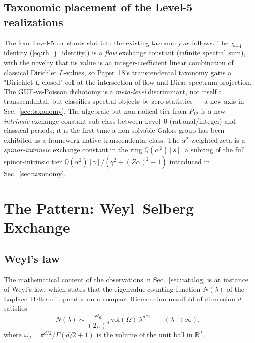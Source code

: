 \documentclass[aps,pra,twocolumn,superscriptaddress,longbibliography]{revtex4-2}
\begin{document}
\subsection*{Taxonomic placement of the Level-5 realizations}

The four Level-5 constants slot into the existing taxonomy as
follows. The $\chi_{-4}$ identity (\ref{eq:rh_j_identity}) is a
\emph{flow} exchange constant (infinite spectral sum), with the
novelty that its value is an integer-coefficient linear combination
of classical Dirichlet $L$-values, so Paper~18's transcendental
taxonomy gains a "Dirichlet-$L$-closed" cell at the intersection of
flow and Dirac-spectrum projection. The GUE-vs-Poisson dichotomy is
a \emph{meta-level} discriminant, not itself a transcendental, but
classifies spectral objects by zero statistics --- a new axis in
Sec.~\ref{sec:taxonomy}. The algebraic-but-non-radical tier from
$P_{12}$ is a new \emph{intrinsic} exchange-constant sub-class
between Level~0 (rational/integer) and classical periods; it is the
first time a non-solvable Galois group has been exhibited as a
framework-native transcendental class. The $\alpha^2$-weighted
zeta is a \emph{spinor-intrinsic} exchange constant in the ring
$\mathbb{Q}(\alpha^2)[s]$, a subring of the full spinor-intrinsic
tier $\mathbb{Q}(\alpha^2)[\gamma]/(\gamma^2 + (Z\alpha)^2 - 1)$
introduced in Sec.~\ref{sec:taxonomy}.


\section{The Pattern: Weyl--Selberg Exchange}
\label{sec:pattern}

\subsection{Weyl's law}

The mathematical content of the observations in
Sec.~\ref{sec:catalog} is an instance of Weyl's law, which
states that the eigenvalue counting function $N(\lambda)$ of
the Laplace--Beltrami operator on a compact Riemannian manifold
of dimension $d$ satisfies~\cite{weyl1911}
\begin{equation}
  N(\lambda) \sim \frac{\omega_d}{(2\pi)^d}\,
  \mathrm{vol}(\Omega)\,\lambda^{d/2}
  \qquad (\lambda \to \infty),
  \label{eq:weyl}
\end{equation}
where $\omega_d = \pi^{d/2}/\Gamma(d/2+1)$ is the volume of
the unit ball in $\mathbb{R}^d$.
\end{document}
